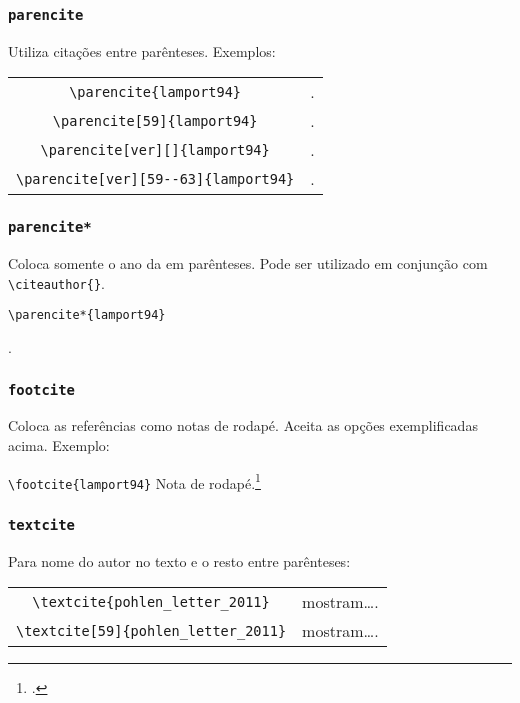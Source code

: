 \subsubsection*{\texttt{parencite}}
Utiliza citações entre parênteses. Exemplos:


\begin{tabular}{cc}
\centering
\verb+\parencite{lamport94}+ & \parencite{lamport94}.\\

\verb+\parencite[59]{lamport94}+ & \parencite[59]{lamport94}.\\

\verb+\parencite[ver][]{lamport94}+ &  \parencite[ver][]{lamport94}.\\

\verb+\parencite[ver][59--63]{lamport94}+ &  \parencite[ver][59--63]{lamport94}.\\
\end{tabular}

\subsubsection*{\texttt{parencite*}}
Coloca somente o ano da em parênteses. Pode ser utilizado em conjunção com \verb+\citeauthor{}+.

\begin{center}
\verb+\parencite*{lamport94}+\qquad

 \parencite*{lamport94}.
\end{center}

\subsubsection*{\texttt{footcite}}
Coloca as referências como notas de rodapé. Aceita as opções exemplificadas acima. Exemplo:


\begin{center}
\verb+\footcite{lamport94}+\qquad
 Nota de rodapé.\footcite{lamport94}
\end{center}


\subsubsection*{\texttt{textcite}}
Para nome do autor no texto e o resto entre parênteses:

\begin{tabular}{cc}
\centering
\verb+\textcite{pohlen_letter_2011}+ & \textcite{pohlen_letter_2011} mostram\ldots .\\

\verb+\textcite[59]{pohlen_letter_2011}+ & \textcite[59]{pohlen_letter_2011} mostram\ldots .\\

\end{tabular}

